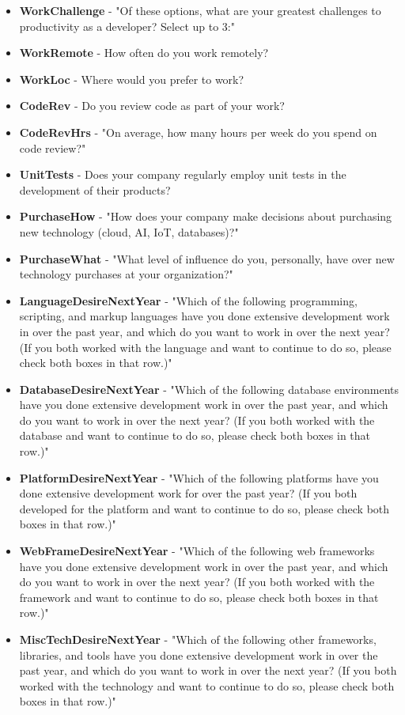 \begin{appendices}
\begin{itemize}
        \item \textbf{WorkChallenge} - "Of these options, what are your greatest challenges to productivity as a developer? Select up to 3:"
        \item \textbf{WorkRemote} - How often do you work remotely?
        \item \textbf{WorkLoc} - Where would you prefer to work?
        \item \textbf{CodeRev} - Do you review code as part of your work?
        \item \textbf{CodeRevHrs} - "On average, how many hours per week do you spend on code review?"
        \item \textbf{UnitTests} - Does your company regularly employ unit tests in the development of their products?
        \item \textbf{PurchaseHow} - "How does your company make decisions about purchasing new technology (cloud, AI, IoT, databases)?"
        \item \textbf{PurchaseWhat} - "What level of influence do you, personally, have over new technology purchases at your organization?"
        \item \textbf{LanguageDesireNextYear} - "Which of the following programming, scripting, and markup languages have you done extensive development work in over the past year, and which do you want to work in over the next year?  (If you both worked with the language and want to continue to do so, please check both boxes in that row.)"
        \item \textbf{DatabaseDesireNextYear} - "Which of the following database environments have you done extensive development work in over the past year, and which do you want to work in over the next year?   (If you both worked with the database and want to continue to do so, please check both boxes in that row.)"
        \item \textbf{PlatformDesireNextYear} - "Which of the following platforms have you done extensive development work for over the past year?   (If you both developed for the platform and want to continue to do so, please check both boxes in that row.)"
        \item \textbf{WebFrameDesireNextYear} - "Which of the following web frameworks have you done extensive development work in over the past year, and which do you want to work in over the next year? (If you both worked with the framework and want to continue to do so, please check both boxes in that row.)"
        \item \textbf{MiscTechDesireNextYear} - "Which of the following other frameworks, libraries, and tools have you done extensive development work in over the past year, and which do you want to work in over the next year? (If you both worked with the technology and want to continue to do so, please check both boxes in that row.)"

\end{itemize}
\end{appendices}
